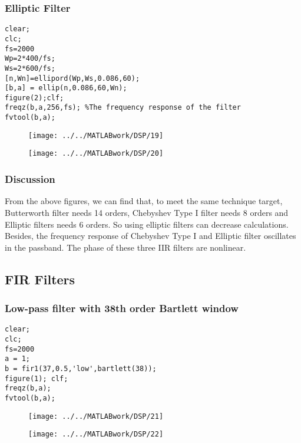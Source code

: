 \documentclass[12pt,a4paper]{article}
\begin{document}
\subsubsection{Elliptic Filter}
\begin{lstlisting}
clear;
clc;
fs=2000
Wp=2*400/fs;
Ws=2*600/fs;
[n,Wn]=ellipord(Wp,Ws,0.086,60);
[b,a] = ellip(n,0.086,60,Wn);
figure(2);clf;
freqz(b,a,256,fs); %The frequency response of the filter
fvtool(b,a);
\end{lstlisting}
\begin{figure}[htbp]
	\centering
	\begin{minipage}[h]{0.48\textwidth}
		\centering
		\texttt{[image: ../../MATLABwork/DSP/19]}
	\end{minipage}
	\begin{minipage}[htbp]{0.48\textwidth}
		\centering
		\texttt{[image: ../../MATLABwork/DSP/20]}
	\end{minipage}
\end{figure}
\subsubsection{Discussion}
From the above figures, we can find that, to meet the same technique target, Butterworth filter needs 14 orders, Chebyshev Type I filter needs 8 orders and Elliptic filters needs 6 orders. So using elliptic filters can decrease calculations. Besides, the frequency response of Chebyshev Type I and Elliptic filter oscillates in the passband. The phase of these three IIR filters are nonlinear.

\subsection{FIR Filters}
\subsubsection{Low-pass filter with 38th order Bartlett window}
\begin{lstlisting}
clear;
clc;
fs=2000
a = 1;
b = fir1(37,0.5,'low',bartlett(38));
figure(1); clf;
freqz(b,a);
fvtool(b,a);
\end{lstlisting}
\begin{figure}[htbp]
	\centering
	\begin{minipage}[h]{0.48\textwidth}
		\centering
		\texttt{[image: ../../MATLABwork/DSP/21]}
	\end{minipage}
	\begin{minipage}[htbp]{0.48\textwidth}
		\centering
		\texttt{[image: ../../MATLABwork/DSP/22]}
	\end{minipage}
\end{figure}
\end{document}

